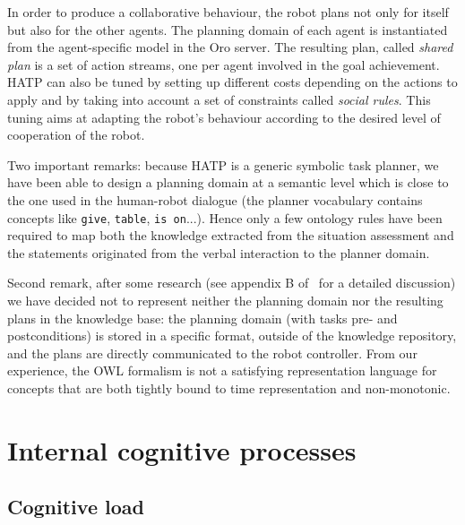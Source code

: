 \documentclass[letterpaper, 10 pt, conference]{ieeeconf}  %
\begin{document}
In order to produce a collaborative behaviour, the robot plans not only for
itself but also for the other agents. The planning domain of each agent is
instantiated from the agent-specific model in the {\sc Oro} server. The resulting
plan, called \emph{shared plan} is a set of action streams, one per
agent involved in the goal achievement. HATP can also be tuned by setting up
different costs depending on the actions to apply and by taking into account a
set of constraints called \emph{social rules}. This tuning aims at adapting the
robot's behaviour according to the desired level of cooperation of the robot.


Two important remarks: because HATP is a generic symbolic task planner, we have
been able to design a planning domain at a semantic level which is close to the
one used in the human-robot dialogue (the planner vocabulary contains concepts
like \texttt{give}, \texttt{table}, \texttt{is on}...). Hence only a few
ontology rules have been required to map both the knowledge extracted from the
situation assessment and the statements originated from the verbal interaction
to the planner domain.

Second remark, after some research (see appendix B of~\cite{Lemaignan2012a} for
a detailed discussion)  we have decided not to represent neither the planning
domain nor the resulting plans in the knowledge base: the planning domain (with
tasks pre- and postconditions) is stored in a specific format, outside of the
knowledge repository, and the plans are directly communicated to the robot
controller. From our experience, the OWL formalism is not a satisfying
representation language for concepts that are both tightly bound to time
representation and non-monotonic.


\section{Internal cognitive processes}
\label{sect|intern}

\subsection{Cognitive load}
\end{document}
